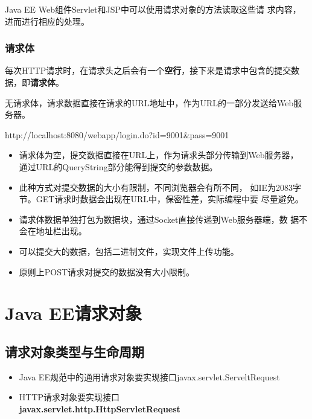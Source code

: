{\kai\Red Java EE Web组件Servlet和JSP中可以使用请求对象的方法读取这些请
  求内容，进而进行相应的处理。}


\subsubsection{请求体} 

每次HTTP请求时，在请求头之后会有一个{\bf\Red 空行}，接下来是请求中包含的提交数据，即{\bf\Blue 请求体}。


无请求体，请求数据直接在请求的URL地址中，作为URL的一部分发送给Web服务器。
  
\begin{xmlCode}
  http://localhost:8080/webapp/login.do?id=9001&pass=9001
\end{xmlCode}


\begin{itemize}
\item 请求体为空，提交数据直接在URL上，作为请求头部分传输到Web服务器，
  通过URL的QueryString部分能得到提交的参数数据。
\item 此种方式对提交数据的大小有限制，不同浏览器会有所不同，
  如IE为2083字节。GET请求时数据会出现在URL中，保密性差，实际编程中要
  尽量避免。
\end{itemize}


\begin{itemize}
\item 请求体数据单独打包为数据块，通过Socket直接传递到Web服务器端，数
  据不会在地址栏出现。
\item 可以提交大的数据，包括二进制文件，实现文件上传功能。
\item 原则上POST请求对提交的数据没有大小限制。
\end{itemize}

\section{Java EE请求对象}

\subsection{请求对象类型与生命周期} 


\begin{itemize}
\item Java EE规范中的通用请求对象要实现接口javax.servlet.ServeltRequest
\item HTTP请求对象要实现接口\\{\bf\Red javax.servlet.http.HttpServletRequest}
\end{itemize}

